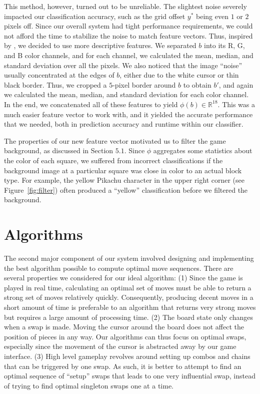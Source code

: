 \documentclass[12pt]{IEEEtran}
\begin{document}
This method, however, turned out to be unreliable. The slightest noise severely impacted our classification accuracy, such as the grid offset $y^*$ being even $1$ or $2$ pixels off. Since our overall system had tight performance requirements, we could not afford the time to stabilize the noise to match feature vectors. Thus, inspired by \cite{1}, we decided to use more descriptive features. We separated $b$ into its R, G, and B color channels, and for each channel, we calculated the mean, median, and standard deviation over all the pixels. We also noticed that the image ``noise'' usually concentrated at the edges of $b$, either due to the white cursor or thin black border. Thus, we cropped a $5$-pixel border around $b$ to obtain $b'$, and again we calculated the mean, median, and standard deviation for each color channel. In the end, we concatenated all of these features to yield $\phi(b) \in \mathbb{R}^{18}$. This was a much easier feature vector to work with, and it yielded the accurate performance that we needed, both in prediction accuracy and runtime within our classifier.

The properties of our new feature vector motivated us to filter the game background, as discussed in Section $5.1$. Since $\phi$ aggregates some statistics about the color of each square, we suffered from incorrect classifications if the background image at a particular square was close in color to an actual block type. For example, the yellow Pikachu character in the upper right corner (see Figure~\ref{fig:filter}) often produced a ``yellow'' classification before we filtered the background.

\section{Algorithms}

The second major component of our system involved designing and implementing the best algorithm possible to compute optimal move sequences. There are several properties we considered for our ideal algorithm:
(1) Since the game is played in real time, calculating an optimal set of moves must be able to return a strong set of moves relatively quickly. Consequently, producing decent moves in a short amount of time is preferable to an algorithm that returns very strong moves but requires a large amount of processing time.
(2) The board state only changes when a swap is made. Moving the cursor around the board does not affect the position of pieces in any way. Our algorithms can thus focus on optimal swaps, especially since the movement of the cursor is abstracted away by our game interface.
(3) High level gameplay revolves around setting up combos and chains that can be triggered by one swap. As such, it is better to attempt to find an optimal sequence of ``setup'' swaps that leads to one very influential swap, instead of trying to find optimal singleton swaps one at a time.
\end{document}
